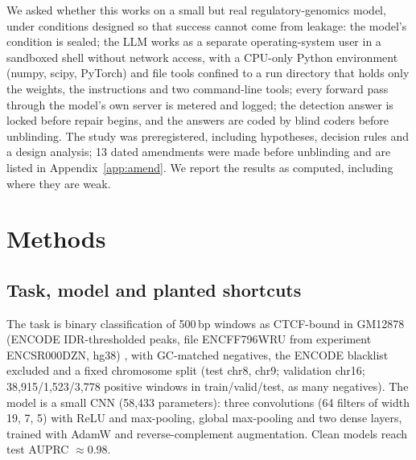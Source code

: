 \documentclass[11pt]{article}
\begin{document}
We asked whether this works on a small but real regulatory-genomics model, under conditions designed so that
success cannot come from leakage: the model's condition is sealed; the LLM works as a separate operating-system user in
a sandboxed shell without network access, with a CPU-only Python environment (numpy, scipy, PyTorch) and file tools
confined to a run directory that holds only the weights, the instructions and two command-line tools; every forward
pass through the model's own server is metered and logged; the detection answer is locked before repair begins, and the
answers are coded by blind coders before unblinding. The study was preregistered, including hypotheses, decision
rules and a design analysis; 13 dated amendments were made before unblinding and are listed in
Appendix~\ref{app:amend}. We report the results as computed, including where they are weak.

\section{Methods}
\subsection{Task, model and planted shortcuts}
The task is binary classification of 500\,bp windows as CTCF-bound in GM12878 (ENCODE IDR-thresholded peaks,
file ENCFF796WRU from experiment ENCSR000DZN, hg38)
\citep{encode2012}, with GC-matched negatives, the ENCODE blacklist excluded and a fixed
chromosome split (test chr8, chr9; validation chr16; 38,915/1,523/3,778 positive windows in train/valid/test, as
many negatives). The model is a small CNN (58,433 parameters): three convolutions (64 filters of width 19, 7, 5)
with ReLU and max-pooling, global max-pooling and two dense layers, trained with AdamW \citep{loshchilov2019adamw} and
reverse-complement augmentation. Clean models reach test AUPRC $\approx$0.98.
\end{document}
